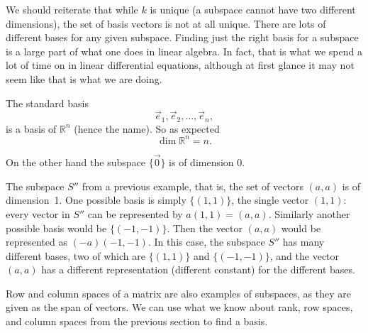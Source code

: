 \documentclass{ximera}
\begin{document}

We should reiterate that while $k$ is unique (a subspace cannot have two different dimensions), the set of basis vectors is not at all unique.  There are lots of different bases for any given subspace.  Finding just the right basis for a subspace is a large part of what one does in linear algebra.  In fact, that is what we spend a lot of time on in linear differential equations, although at first glance it may not seem like that is what we are doing.

\begin{example}
    The standard basis
    \begin{equation*}
        \vec{e}_1, \vec{e}_2, \ldots, \vec{e}_n ,
    \end{equation*}
    is a basis of ${\mathbb R}^n$ (hence the name). So as expected
    \begin{equation*}
        \dim {\mathbb R}^n = n .
    \end{equation*}
    
    On the other hand the subspace $\{ \vec{0} \}$ is of dimension $0$.
    
    The subspace $S''$ from a previous example, that is, the set of vectors $(a,a)$ is of dimension~1.  One possible basis is simply $\{ (1,1) \}$, the single vector $(1,1)$: every vector in $S''$ can be represented by $a (1,1) = (a,a)$.  Similarly another possible basis would be $\{ (-1,-1) \}$.  Then the vector $(a,a)$ would be represented as $(-a) (-1,-1)$. In this case, the subspace $S''$ has many different bases, two of which are $\{(1,1)\}$ and $\{(-1,-1)\}$, and the vector $(a,a)$ has a different representation (different constant) for the different bases.
\end{example}

Row and column spaces of a matrix are also examples of subspaces, as they are given as the span of vectors. We can use what we know about rank, row spaces, and column spaces from the previous section to find a basis.
\end{document}
